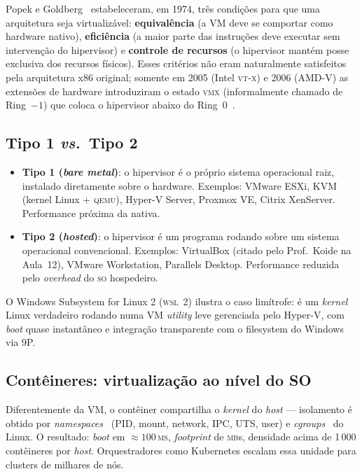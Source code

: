 Popek e Goldberg~\cite{popek1974} estabeleceram, em 1974, três
condições para que uma arquitetura seja virtualizável:
\textbf{equivalência} (a VM deve se comportar como hardware nativo),
\textbf{eficiência} (a maior parte das instruções deve executar sem
intervenção do hipervisor) e \textbf{controle de recursos}
(o hipervisor mantém posse exclusiva dos recursos físicos). Esses
critérios não eram naturalmente satisfeitos pela arquitetura
x86 original; somente em 2005 (Intel \textsc{vt-x}) e 2006 (AMD-V) as
extensões de hardware introduziram o estado \textsc{vmx} (informalmente
chamado de Ring~$-1$) que coloca o hipervisor abaixo do
Ring~0~\cite{russinovich2017}.

\subsection{Tipo 1 \textit{vs.}\ Tipo 2}

\begin{itemize}
    \item \textbf{Tipo 1 (\textit{bare metal})}: o hipervisor é o
          próprio sistema operacional raiz, instalado diretamente
          sobre o hardware. Exemplos: VMware ESXi, KVM (kernel
          Linux + \textsc{qemu}), Hyper-V Server, Proxmox VE, Citrix
          XenServer. Performance próxima da nativa.
    \item \textbf{Tipo 2 (\textit{hosted})}: o hipervisor é um
          programa rodando sobre um sistema operacional convencional.
          Exemplos: VirtualBox (citado pelo Prof.\ Koide na Aula~12),
          VMware Workstation, Parallels Desktop. Performance reduzida
          pelo \textit{overhead} do \textsc{so} hospedeiro.
\end{itemize}

O Windows Subsystem for Linux 2 (\textsc{wsl}~2) ilustra o caso
limítrofe: é um \emph{kernel} Linux verdadeiro rodando numa VM
\textit{utility} leve gerenciada pelo Hyper-V, com \textit{boot}
quase instantâneo e integração transparente com o filesystem do
Windows via 9P.

\subsection{Contêineres: virtualização ao nível do SO}

Diferentemente da VM, o contêiner compartilha o \emph{kernel} do
\textit{host} --- isolamento é obtido por \textit{namespaces}~\cite{man7namespaces}
(PID, mount, network, IPC, UTS, user) e \textit{cgroups}~\cite{kernelcgroups}
do Linux. O resultado: \textit{boot} em $\approx
100$\,\textsc{ms}, \textit{footprint} de \textsc{mb}s, densidade
acima de 1\,000 contêineres por \emph{host}.
Orquestradores como Kubernetes escalam essa unidade para clusters de
milhares de nós.

